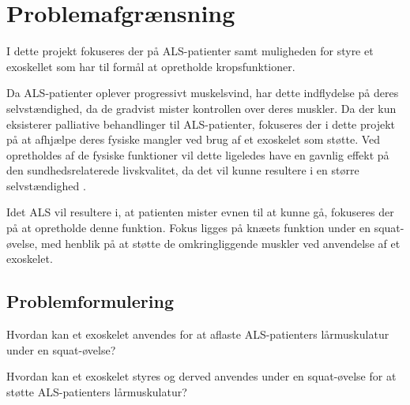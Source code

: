 \section{Problemafgrænsning}
I dette projekt fokuseres der på ALS-patienter samt muligheden for styre et exoskellet som har til formål at opretholde kropsfunktioner. 

Da ALS-patienter oplever progressivt muskelsvind, har dette indflydelse på deres selvstændighed, da de gradvist mister kontrollen over deres muskler. Da der kun eksisterer palliative behandlinger til ALS-patienter, fokuseres der i dette projekt på at afhjælpe deres fysiske mangler ved brug af et exoskelet som støtte.
Ved opretholdes af de fysiske funktioner vil dette ligeledes have en gavnlig effekt på den sundhedsrelaterede livskvalitet, da det vil kunne resultere i en større selvstændighed \citep{ilse2015, tramonti2012}.%

Idet ALS vil resultere i, at patienten mister evnen til at kunne gå, fokuseres der på at opretholde denne funktion. Fokus ligges på knæets funktion under en squat-øvelse, med henblik på at støtte de omkringliggende muskler ved anvendelse af et exoskelet.

\subsection{Problemformulering}
Hvordan kan et exoskelet anvendes for at aflaste ALS-patienters lårmuskulatur under en squat-øvelse?

Hvordan kan et exoskelet styres og derved anvendes under en squat-øvelse for at støtte ALS-patienters lårmuskulatur?